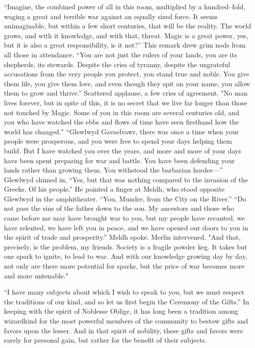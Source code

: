 “Imagine, the combined power of all in this room, multiplied by a hundred\mbox{--}fold, waging a great and terrible war against an equally sized force. It seems unimaginable, but within a few short centuries, that will be the reality. The world grows, and with it knowledge, and with that, threat. Magic is a great power, yes, but it is also a great responsibility, is it not?”
\SmallVSpace
This remark drew grim nods from all those in attendance.
\SmallVSpace
“You are not just the rulers of your lands, you are its shepherds, its stewards. Despite the cries of tyranny, despite the ungrateful accusations from the very people you protect, you stand true and noble. You give them life, you give them love, and even though they spit on your name, you allow them to grow and thrive.”
\SmallVSpace
Scattered applause, a few cries of agreement.
\SmallVSpace
"No man lives forever, but in spite of this, it is no secret that we live far longer than those not touched by Magic. Some of you in this room are several centuries old, and you who have watched the ebbs and flows of time have seen firsthand how the world has changed."
\SmallVSpace
“Glewlwyd Gavaelvawr, there was once a time when your people were prosperous, and you were free to spend your days helping them build. But I have watched you over the years, and more and more of your days have been spent preparing for war and battle. You have been defending your lands rather than growing them. You withstood the barbarian hordes\mbox{---}”
\SmallVSpace
Glewlwyd chimed in, “Yes, but that was nothing compared to the invasion of the Greeks. Of his people.” He pointed a finger at Meldh, who stood opposite Glewlwyd in the amphitheater. “You, Mundre, from the City on the River.”
\SmallVSpace
“Do not pass the sins of the father down to the son. My ancestors and those who came before me may have brought war to you, but my people have recanted, we have relented, we have left you in peace, and we have opened our doors to you in the spirit of trade and prosperity.” Meldh spoke.
\SmallVSpace
Merlin intervened. "And that, precisely, is the problem, my friends. Society is a fragile powder keg. It takes but one spark to ignite, to lead to war. And with our knowledge growing day by day, not only are there more potential for sparks, but the price of war becomes more and more untenable."

“I have many subjects about which I wish to speak to you, but we must respect the traditions of our kind, and so let us first begin the Ceremony of the Gifts.”
\SomeVSpace
In keeping with the spirit of Noblesse Oblige, it has long been a tradition among wizardkind for the most powerful members of the community to bestow gifts and favors upon the lesser. And in that spirit of nobility, these gifts and favors were rarely for personal gain, but rather for the benefit of their subjects.

